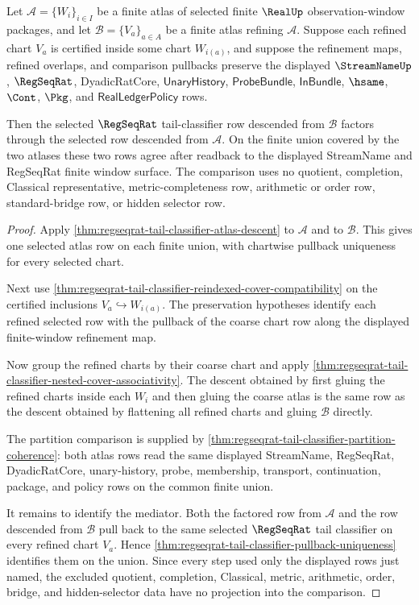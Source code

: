 \begin{theorem}
\label{thm:regseqrat-tail-classifier-atlas-refinement-invariance}
Let $\mathcal{A}=\{W_i\}_{i\in I}$ be a finite atlas of selected finite
$\RealUp$ observation-window packages, and let
$\mathcal{B}=\{V_a\}_{a\in A}$ be a finite atlas refining $\mathcal{A}$.
Suppose each refined chart $V_a$ is certified inside some chart $W_{i(a)}$,
and suppose the refinement maps, refined overlaps, and comparison pullbacks
preserve the displayed $\StreamNameUp$, $\RegSeqRat$, DyadicRatCore,
$\mathsf{UnaryHistory}$, $\mathsf{ProbeBundle}$, $\mathsf{InBundle}$,
$\hsame$, $\Cont$, $\Pkg$, and $\mathsf{RealLedgerPolicy}$ rows.

Then the selected $\RegSeqRat$ tail-classifier row descended from
$\mathcal{B}$ factors through the selected row descended from
$\mathcal{A}$. On the finite union covered by the two atlases these two
rows agree after readback to the displayed StreamName and RegSeqRat finite
window surface. The comparison uses no quotient, completion, Classical
representative, metric-completeness row, arithmetic or order row,
standard-bridge row, or hidden selector row.
\end{theorem}
\begin{proof}
Apply \autoref{thm:regseqrat-tail-classifier-atlas-descent} to
$\mathcal{A}$ and to $\mathcal{B}$. This gives one selected atlas row on each
finite union, with chartwise pullback uniqueness for every selected chart.

Next use
\autoref{thm:regseqrat-tail-classifier-reindexed-cover-compatibility} on the
certified inclusions $V_a\hookrightarrow W_{i(a)}$. The preservation
hypotheses identify each refined selected row with the pullback of the
coarse chart row along the displayed finite-window refinement map.

Now group the refined charts by their coarse chart and apply
\autoref{thm:regseqrat-tail-classifier-nested-cover-associativity}. The
descent obtained by first gluing the refined charts inside each $W_i$ and
then gluing the coarse atlas is the same row as the descent obtained by
flattening all refined charts and gluing $\mathcal{B}$ directly.

The partition comparison is supplied by
\autoref{thm:regseqrat-tail-classifier-partition-coherence}: both atlas rows
read the same displayed StreamName, RegSeqRat, DyadicRatCore, unary-history,
probe, membership, transport, continuation, package, and policy rows on the
common finite union.

It remains to identify the mediator. Both the factored row from
$\mathcal{A}$ and the row descended from $\mathcal{B}$ pull back to the same
selected $\RegSeqRat$ tail classifier on every refined chart $V_a$. Hence
\autoref{thm:regseqrat-tail-classifier-pullback-uniqueness} identifies them
on the union. Since every step used only the displayed rows just named, the
excluded quotient, completion, Classical, metric, arithmetic, order, bridge,
and hidden-selector data have no projection into the comparison.
\end{proof}

